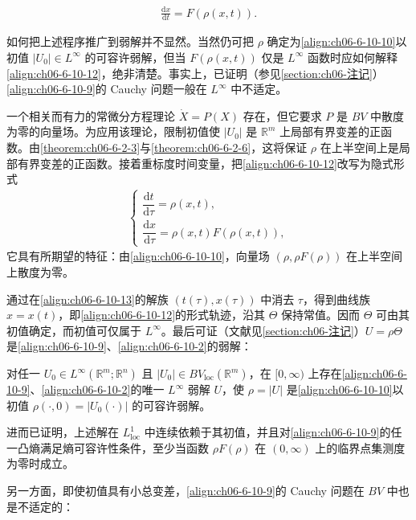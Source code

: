 \documentclass[../../main.tex]{subfiles}
\begin{document}
\begin{align}
\frac{\mathrm{d}x}{\mathrm{d}t}=F(\rho(x,t)).
\label{align:ch06-6-10-12}
\end{align}

如何把上述程序推广到弱解并不显然。当然仍可把 $\rho$ 确定为\eqref{align:ch06-6-10-10}以初值 $|U_{0}|\in L^{\infty}$ 的可容许弱解，但当 $F(\rho(x,t))$ 仅是 $L^{\infty}$ 函数时应如何解释\eqref{align:ch06-6-10-12}，绝非清楚。事实上，已证明（参见\cref{section:ch06-注记}）\eqref{align:ch06-6-10-9}的 Cauchy 问题一般在 $L^{\infty}$ 中不适定。

一个相关而有力的常微分方程理论 $\dot{X}=P(X)$ 存在，但它要求 $P$ 是 $BV$ 中散度为零的向量场。为应用该理论，限制初值使 $|U_{0}|$ 是 $\mathbb{R}^{m}$ 上局部有界变差的正函数。由\cref{theorem:ch06-6-2-3}与\cref{theorem:ch06-6-2-6}，这将保证 $\rho$ 在上半空间上是局部有界变差的正函数。接着重标度时间变量，把\eqref{align:ch06-6-10-12}改写为隐式形式
\begin{align}
\begin{cases}
\dfrac{\mathrm{d}t}{\mathrm{d}\tau}=\rho(x,t),\\[6pt]
\dfrac{\mathrm{d}x}{\mathrm{d}\tau}=\rho(x,t)F(\rho(x,t)),
\end{cases}
\label{align:ch06-6-10-13}
\end{align}
它具有所期望的特征：由\eqref{align:ch06-6-10-10}，向量场 $(\rho,\rho F(\rho))$ 在上半空间上散度为零。

通过在\eqref{align:ch06-6-10-13}的解族 $(t(\tau),x(\tau))$ 中消去 $\tau$，得到曲线族 $x=x(t)$，即\eqref{align:ch06-6-10-12}的形式轨迹，沿其 $\Theta$ 保持常值。因而 $\Theta$ 可由其初值确定，而初值可仅属于 $L^{\infty}$。最后可证（文献见\cref{section:ch06-注记}）$U=\rho\Theta$ 是\eqref{align:ch06-6-10-9}、\eqref{align:ch06-6-10-2}的弱解：


\begin{theorem}\label{theorem:ch06-6-10-3}
对任一 $U_{0}\in L^{\infty}(\mathbb{R}^{m};\mathbb{R}^{n})$ 且 $|U_{0}|\in BV_{\mathrm{loc}}(\mathbb{R}^{m})$，在 $[0,\infty)$ 上存在\eqref{align:ch06-6-10-9}、\eqref{align:ch06-6-10-2}的唯一 $L^{\infty}$ 弱解 $U$，使 $\rho=|U|$ 是\eqref{align:ch06-6-10-10}以初值 $\rho(\cdot,0)=|U_{0}(\cdot)|$ 的可容许弱解。
\end{theorem}

进而已证明，上述解在 $L^{1}_{\mathrm{loc}}$ 中连续依赖于其初值，并且对\eqref{align:ch06-6-10-9}的任一凸熵满足熵可容许性条件，至少当函数 $\rho F(\rho)$ 在 $(0,\infty)$ 上的临界点集测度为零时成立。

另一方面，即使初值具有小总变差，\eqref{align:ch06-6-10-9}的 Cauchy 问题在 $BV$ 中也是不适定的：
\end{document}
